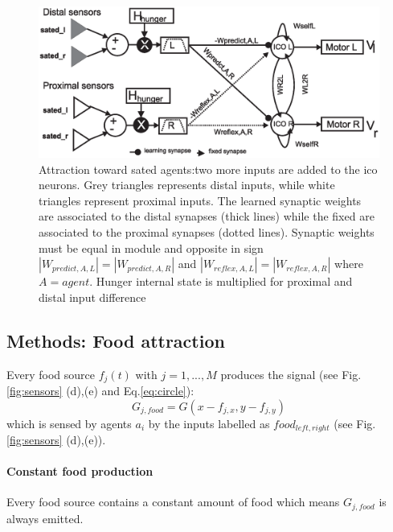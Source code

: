 \begin{figure}[htb]
\includegraphics[scale=0.4]{figures/socialadapt/attractionAgent.eps}
\small{
\caption[Attractive behaviour for other agents]{
Attraction toward sated agents:two more inputs are added to the ico neurons.
Grey triangles represents distal inputs, while white triangles represent
proximal inputs. The learned synaptic weights are associated to the distal
synapses (thick lines) while the fixed are associated to the proximal
synapses (dotted lines). Synaptic weights must be equal in module and
opposite in sign $|W_{predict,A,L}|=|W_{predict,A,R}|$ and
$|W_{reflex,A,L}|=|W_{reflex,A,R}|$  where $A=agent$.
Hunger internal state is multiplied for proximal and distal
input difference \label{fig:attractionAgent}}
}

\end{figure}


\subsection{Methods: Food attraction}
Every food source $f_{j}(t)$ with $j=1,...,M$ produces the signal
(see Fig.\ref{fig:sensors} (d),(e) and Eq.\ref{eq:circle}):
\begin{equation}
G_{j,food}=G(x-f_{j,x},y-f_{j,y})
\label{eq:food}
\end{equation}
which is sensed by agents $a_{i}$ by the inputs labelled as
$food_{left,right}$ (see Fig.\ref{fig:sensors} (d),(e)).
\paragraph{Constant food production}
Every food source contains a constant amount of food which means $G_{j,food}$
is always emitted.

